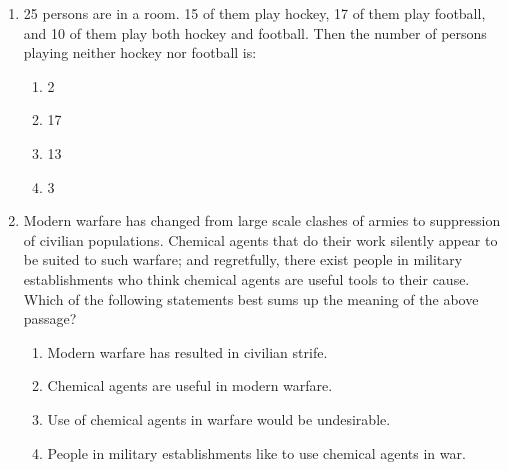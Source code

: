 \documentclass[journal]{IEEEtran}
\begin{document}
\begin{enumerate}
        \begin{multicols}{4}
            \begin{enumerate}
                \item masked
                \item belied
                \item betrayed
                \item suppressed
            \end{enumerate}
        \end{multicols}
		
    \item 25 persons are in a room. 15 of them play hockey, 17 of them play football, and 10 of them play both hockey and football. Then the number of persons playing neither hockey nor football is:

        \begin{multicols}{4}
            \begin{enumerate}
                \item 2
                \item 17
                \item 13
                \item 3
            \end{enumerate}
        \end{multicols}

    \item Modern warfare has changed from large scale clashes of armies to suppression of civilian populations. Chemical agents that do their work silently appear to be suited to such warfare; and regretfully, there exist people in military establishments who think chemical agents are useful tools to their cause.\\
    Which of the following statements best sums up the meaning of the above passage?


            \begin{enumerate}
                \item Modern warfare has resulted in civilian strife.
                \item Chemical agents are useful in modern warfare.
                \item Use of chemical agents in warfare would be undesirable.
                \item People in military establishments like to use chemical agents in war.
            \end{enumerate}



\end{enumerate}
\end{document}
